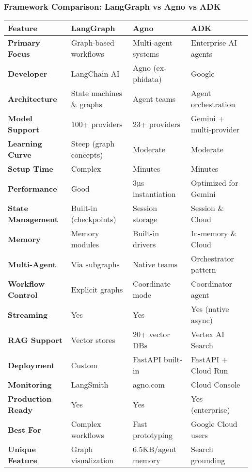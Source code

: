 \begin{frame}[fragile]\frametitle{Framework Comparison: LangGraph vs Agno vs ADK}
\begin{table}
\tiny
\begin{tabular}{|p{2cm}|p{2cm}|p{2cm}|p{2cm}|}
\hline
\textbf{Feature} & \textbf{LangGraph} & \textbf{Agno} & \textbf{ADK} \\ \hline
\textbf{Primary Focus} & Graph-based workflows & Multi-agent systems & Enterprise AI agents \\ \hline
\textbf{Developer} & LangChain AI & Agno (ex-phidata) & Google \\ \hline
\textbf{Architecture} & State machines \& graphs & Agent teams & Agent orchestration \\ \hline
\textbf{Model Support} & 100+ providers & 23+ providers & Gemini + multi-provider \\ \hline
\textbf{Learning Curve} & Steep (graph concepts) & Moderate & Moderate \\ \hline
\textbf{Setup Time} & Complex & Minutes & Minutes \\ \hline
\textbf{Performance} & Good & 3µs instantiation & Optimized for Gemini \\ \hline
\textbf{State Management} & Built-in (checkpoints) & Session storage & Session \& Cloud \\ \hline
\textbf{Memory} & Memory modules & Built-in drivers & In-memory \& Cloud \\ \hline
\textbf{Multi-Agent} & Via subgraphs & Native teams & Orchestrator pattern \\ \hline
\textbf{Workflow Control} & Explicit graphs & Coordinate mode & Coordinator agent \\ \hline
\textbf{Streaming} & Yes & Yes & Yes (native async) \\ \hline
\textbf{RAG Support} & Vector stores & 20+ vector DBs & Vertex AI Search \\ \hline
\textbf{Deployment} & Custom & FastAPI built-in & FastAPI + Cloud Run \\ \hline
\textbf{Monitoring} & LangSmith & agno.com & Cloud Console \\ \hline
\textbf{Production Ready} & Yes & Yes & Yes (enterprise) \\ \hline
\textbf{Best For} & Complex workflows & Fast prototyping & Google Cloud users \\ \hline
\textbf{Unique Feature} & Graph visualization & 6.5KB/agent memory & Search grounding \\ \hline
\end{tabular}
\end{table}
\end{frame}


